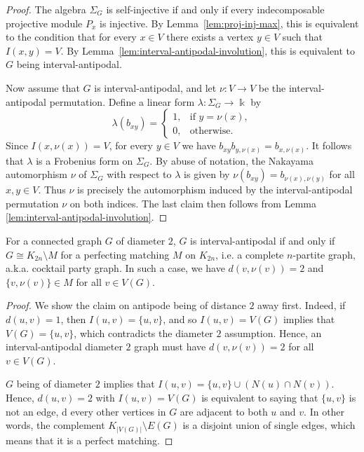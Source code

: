 \documentclass[a4paper,leqno]{amsart}
\begin{document}
\begin{proof}
The algebra $\Sigma_G$ is self-injective if and only if every indecomposable projective module $P_x$ is injective. By Lemma~\ref{lem:proj-inj-max}, this is equivalent to the condition that for every $x\in V$ there exists a vertex $y\in V$ such that $I(x,y)=V$. By Lemma~\ref{lem:interval-antipodal-involution}, this is equivalent to $G$ being interval-antipodal.

Now assume that $G$ is interval-antipodal, and let $\nu:V\to V$ be the interval-antipodal permutation. Define a linear form $\lambda:\Sigma_G\to \Bbbk$ by
$$\lambda(b_{xy})=
\begin{cases}
1, & \text{if } y=\nu(x),\\
0, & \text{otherwise}.
\end{cases}$$
Since $I(x,\nu(x))=V$, for every $y\in V$ we have $b_{xy}b_{y,\nu(x)}=b_{x,\nu(x)}$. It follows that $\lambda$ is a Frobenius form on $\Sigma_G$. By abuse of notation, the Nakayama automorphism $\nu$ of $\Sigma_G$ with respect to $\lambda$ is given by
$\nu(b_{xy})=b_{\nu(x),\nu(y)}$ for all $x,y\in V$. Thus $\nu$ is precisely the automorphism induced by the interval-antipodal permutation $\nu$ on both indices. The last claim then follows from Lemma \ref{lem:interval-antipodal-involution}.
\end{proof}


\begin{prop}\label{prop:diam2 int-antipodal <=> cocktail party}
For a connected graph $G$ of diameter $2$, $G$ is interval-antipodal if and only if $G\cong K_{2n}\setminus M$ for a perfecting matching $M$ on $K_{2n}$, i.e. a complete $n$-partite graph, a.k.a. cocktail party graph.
In such a case, we have $d(v,\nu(v))=2$ and $\{v,\nu(v)\}\in M$ for all $v\in V(G)$.
\end{prop}
\begin{proof}
We show the claim on antipode being of distance $2$ away first.
Indeed, if $d(u,v)=1$, then $I(u,v)=\{u,v\}$, and so $I(u,v)=V(G)$ implies that $V(G)=\{u,v\}$, which contradicts the diameter $2$ assumption.  Hence, an interval-antipodal diameter $2$ graph must have $d(v,\nu(v))=2$ for all $v\in V(G)$.

$G$ being of diameter $2$ implies that $I(u,v)=\{u,v\}\cup (N(u)\cap N(v))$.  Hence, $d(u,v)=2$ with $I(u,v)=V(G)$ is equivalent to saying that $\{u,v\}$ is not an edge, d every other vertices in $G$ are adjacent to both $u$ and $v$.  In other words, the complement $K_{|V(G)|}\setminus E(G)$ is a disjoint union of single edges, which means that it is a perfect matching.
\end{proof}
\end{document}
